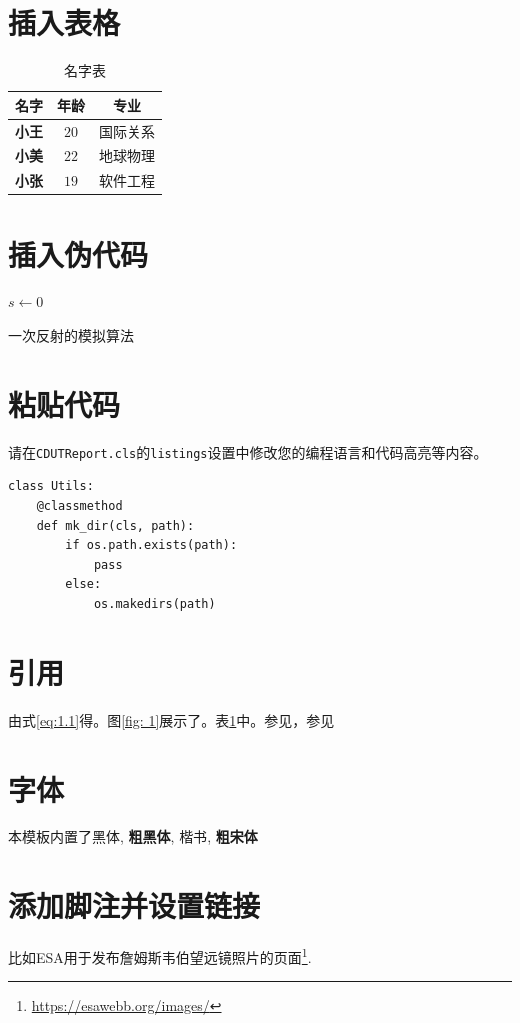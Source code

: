 \section{插入表格} 

\begin{table}[H]
    \centering
    \caption{名字表}
    \label{table: 1}
    \begin{tabular}{ccc}
        \hline
        名字 & 年龄 & 专业 \\
        \hline
        \textbf{小王} & $20$ & 国际关系 \\
        \textbf{小美} & $22$ & 地球物理\\
        \textbf{小张} & $19$ & 软件工程 \\
        \hline
    \end{tabular}
\end{table}

\section{插入伪代码}

\begin{spacing}{1.0}  %
    \begin{algorithm}[H]
        \SetAlgoLined
        $s \leftarrow 0$ \;
        \caption{一次反射的模拟算法}
    \end{algorithm}
\end{spacing}

\section{粘贴代码}
请在\texttt{CDUTReport.cls}的\texttt{listings}设置中修改您的编程语言和代码高亮等内容。
\begin{spacing}{1.0}
\begin{lstlisting}
class Utils:
    @classmethod
    def mk_dir(cls, path):
        if os.path.exists(path):
            pass
        else:
            os.makedirs(path)
\end{lstlisting}
\end{spacing}

\section{引用}
由式\ref{eq:1.1}得。图\ref{fig: 1}展示了。表\ref{table: 1}中。参见\cite{Landou}，参见\cite{liu-meng-2014-seemgo}


\section{字体}
本模板内置了{\heiti 黑体}, {\bfseries\heiti 粗黑体}, {\kaishu 楷书}, {\bfseries\songti 粗宋体}


\section{添加脚注并设置链接}

比如ESA用于发布詹姆斯韦伯望远镜照片的页面\footnote{\url{https://esawebb.org/images/}}.